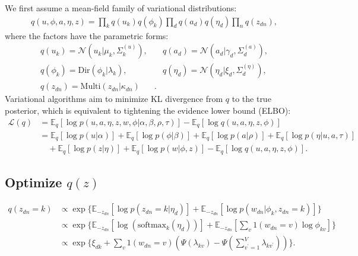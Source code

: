 \documentclass[sigconf]{acmart}
\newcommand{\E}{\mathbb{E}}
\renewcommand*{\bm}[1]{#1}%
\begin{document}
\begin{appendices}
We first assume a mean-field family of variational distributions:
\begin{equation}
\begin{split}
q(\bm{u},\bm{\phi},\bm{a},\bm{\eta},\bm{z}) = \prod\nolimits_{k}q(\bm{u}_k)q(\bm{\phi}_k) \prod\nolimits_{d}q(\bm{a}_d)q(\bm{\eta}_d)\prod\nolimits_n q(z_{dn}),
\end{split}
\end{equation}
where the factors have the parametric forms:
 \begin{equation}
 \begin{split}
 q(\bm{u}_k)=\mathcal{N}(\bm{u}_k|\bm{\mu}_k, \Sigma^{(u)}_{k}),&\quad q(\bm{a}_d)=\mathcal{N}(\bm{a}_d|\bm{\gamma}_d, \Sigma^{(a)}_{d}),\\
 q(\bm{\phi}_k) = \text{Dir}(\bm{\phi}_k|\bm{\lambda}_k),&\quad q(\bm{\eta}_d) = \mathcal{N}(\bm{\eta}_d|\bm{\xi}_d, \Sigma^{(\eta)}_{d}), \\
 q(z_{dn}) = \text{Multi}(z_{dn}|\bm{\kappa}_{dn})&.
\end{split}
\label{suppeq:vi-factor}
\end{equation}
Variational algorithms aim to minimize KL divergence from $q$ to the true posterior, which is equivalent to tightening the evidence lower bound (ELBO):
\begin{equation}
\begin{split}
\mathcal{L}(q) &= \E_q\left[\log p(\bm{u}, \bm{a}, \bm{\eta}, \bm{z}, \bm{w}, \bm{\phi} | \alpha, \beta, \rho, \tau)\right] - \E_q\left[\log q(\bm{u}, \bm{a}, \bm{\eta}, \bm{z}, \bm{\phi})\right]\\
&= \E_q\left[\log p(\bm{u} | \alpha)\right] + \E_q\left[\log p(\bm{\phi} | \beta)\right] + \mathbb{E}_q\left[\log p(\bm{a} | \rho)\right] + \E_q\left[\log p(\bm{\eta} | \bm{u}, \bm{a}, \tau)\right] \\
& \quad + \mathbb{E}_q\left[\log p(\bm{z} | \bm{\eta})\right] + \mathbb{E}_q\left[\log p(\bm{w} | \bm{\phi}, \bm{z})\right] - \mathbb{E}_q\left[\log q(\bm{u}, \bm{a}, \bm{\eta}, \bm{z}, \bm{\phi})\right].
\end{split}
\end{equation}

\subsection{Optimize $q(\bm{z})$}
\begin{equation}
\label{suppeq:vi-zdn}
\begin{split}
q(z_{dn} = k) &\propto \exp\big\{\mathbb{E}_{-z_{dn}}\left[\log p(z_{dn} =k | \bm{\eta_d})\right] + \mathbb{E}_{-z_{dn}}\left[\log p(w_{dn} | \bm{\phi}_k, z_{dn} = k )\right] \big\} \\
&\propto \exp\big\{\mathbb{E}_{-z_{dn}}\left[\log (\text{softmax}_k(\bm{\eta}_d))\right] + \mathbb{E}_{-z_{dn}}\left[\sum\nolimits_v\bm{1}(w_{dn}=v)\log\phi_{kv}\right] \big\} \\
&\propto \exp\big\{\xi_{dk} + \sum\nolimits_v\bm{1}(w_{dn}=v)(\Psi(\lambda_{kv}) - \Psi(\sum_{v^{\prime}=1}^V\lambda_{kv^{\prime}})) \big\}.
\end{split}
\end{equation}


\end{appendices}
\end{document}
